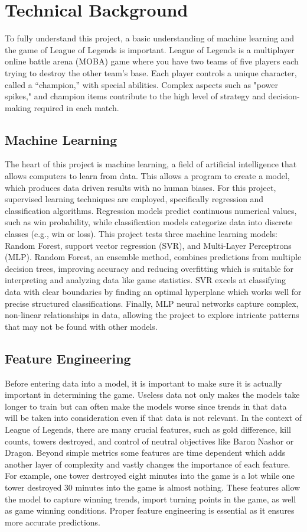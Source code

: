 \documentclass[10pt,twocolumn]{article}
\begin{document}
\section{Technical Background}

To fully understand this project, a basic understanding of machine learning and the game of League of Legends is important.
League of Legends is a multiplayer online battle arena (MOBA) game where you have two teams of five players each trying to destroy the other team's base. Each player controls a unique character, called a “champion,” with special abilities. Complex aspects such as "power spikes," and champion items contribute to the high level of strategy and decision-making required in each match.
\subsection{Machine Learning}
The heart of this project is machine learning, a field of artificial intelligence that allows computers to learn from data. This allows a program to create a model, which produces data driven results with no human biases. For this project, supervised learning techniques are employed, specifically regression and classification algorithms. Regression models predict continuous numerical values, such as win probability, while classification models categorize data into discrete classes (e.g., win or loss). This project tests three machine learning models: Random Forest, support vector regression (SVR), and Multi-Layer Perceptrons (MLP). Random Forest, an ensemble method, combines predictions from multiple decision trees, improving accuracy and reducing overfitting which is suitable for interpreting and analyzing data like game statistics. SVR excels at classifying data with clear boundaries by finding an optimal hyperplane which works well for precise structured classifications. Finally, MLP neural networks capture complex, non-linear relationships in data, allowing the project to explore intricate patterns that may not be found with other models.

\subsection{Feature Engineering}
Before entering data into a model, it is important to make sure it is actually important in determining the game. Useless data not only makes the models take longer to train but can often make the models worse since trends in that data will be taken into consideration even if that data is not relevant. In the context of League of Legends, there are many crucial features, such as gold difference, kill counts, towers destroyed, and control of neutral objectives like Baron Nashor or Dragon. Beyond simple metrics some features are time dependent which adds another layer of complexity and vastly changes the importance of each feature. For example, one tower destroyed eight minutes into the game is a lot while one tower destroyed 30 minutes into the game is almost nothing. These features allow the model to capture winning trends, import turning points in the game, as well as game winning conditions. Proper feature engineering is essential as it ensures more accurate predictions.
\end{document}
